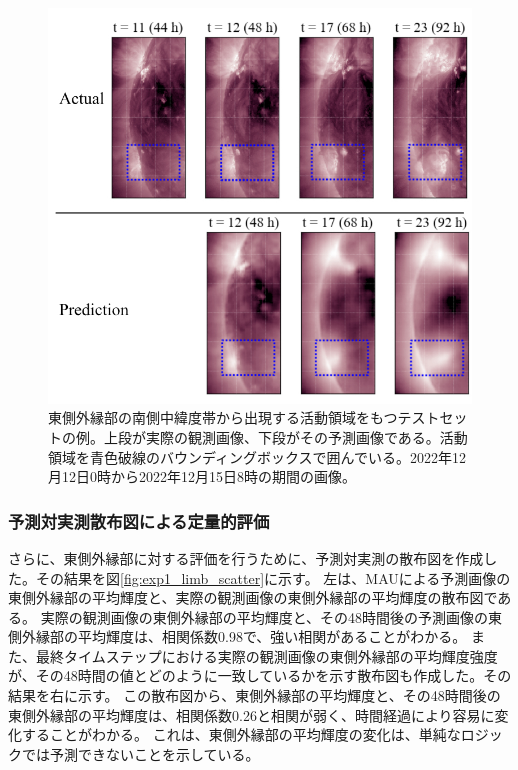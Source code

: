         \begin{figure}[htbp]
          \centering
          \includegraphics[width=\textwidth]{figures/exp1/limb_sample_12_caption.jpg}
          \caption{東側外縁部の南側中緯度帯から出現する活動領域をもつテストセットの例。上段が実際の観測画像、下段がその予測画像である。活動領域を青色破線のバウンディングボックスで囲んでいる。2022年12月12日0時から2022年12月15日8時の期間の画像。}
          \label{fig:exp1_limb_example_2}
        \end{figure}

      \subsubsection{予測対実測散布図による定量的評価}
        さらに、東側外縁部に対する評価を行うために、予測対実測の散布図を作成した。その結果を図\ref{fig:exp1_limb_scatter}に示す。
        左は、MAUによる予測画像の東側外縁部の平均輝度と、実際の観測画像の東側外縁部の平均輝度の散布図である。
        実際の観測画像の東側外縁部の平均輝度と、その48時間後の予測画像の東側外縁部の平均輝度は、相関係数0.98で、強い相関があることがわかる。
        また、最終タイムステップにおける実際の観測画像の東側外縁部の平均輝度強度が、その48時間の値とどのように一致しているかを示す散布図も作成した。その結果を右に示す。
        この散布図から、東側外縁部の平均輝度と、その48時間後の東側外縁部の平均輝度は、相関係数0.26と相関が弱く、時間経過により容易に変化することがわかる。
        これは、東側外縁部の平均輝度の変化は、単純なロジックでは予測できないことを示している。
        
